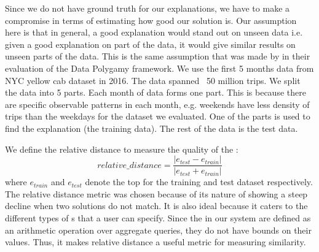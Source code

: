 Since we do not have ground truth for our explanations, we have to make a compromise in terms of estimating how good our solution is. Our assumption here is that in general, a good explanation would stand out on unseen data i.e. given a good explanation on part of the data, it would give similar results on unseen parts of the data. This is the same assumption that was made by \cite{chirigati2016data} in their evaluation of the Data Polygamy framework. 
We use the first 5 months data from  NYC yellow cab dataset in 2016. The data spanned ~50 million trips. 
We split the data into 5 parts. Each month of data forms one part. 
This is because there are specific observable patterns in each month, e.g. weekends have less density of trips than the weekdays for the dataset we evaluated. 
One of the parts is used to find the explanation (the training data). The rest of the data is the test data. 


We define the relative distance to measure the quality of the {\explanation}:
$$relative\_distance = \frac{|e_{test}-e_{train}|}{|e_{test}+e_{train}|}$$
where $e_{train}$ and $e_{test}$ denote the top {\explanation} for the training and test dataset respectively. 
The relative distance metric was chosen because of its nature of showing a steep decline when two solutions do not match. It is also ideal because it caters to the different types of {\fact}s that a user can specify. Since the {\fact} in our system are defined as an arithmetic operation over aggregate queries, they do not have bounds on their values. Thus, it makes relative distance a useful metric for measuring similarity.

